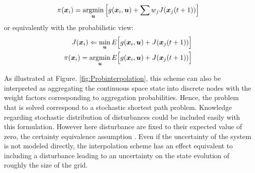 %
\begin{align}
\pi(\boldsymbol{x}_i) = \operatornamewithlimits{argmin}\limits_{\boldsymbol{u}} 
\left[ g(\boldsymbol{x}_i,\boldsymbol{u}) + \sum{ w_j J(\boldsymbol{x}_j(t+1))}  \right]
\end{align}
%
or equivalently with the probabilistic view:
%
\begin{align}
J(\boldsymbol{x}_i) \Leftarrow \operatornamewithlimits{min}\limits_{\boldsymbol{u}} E \Big[ g(\boldsymbol{x}_i,\boldsymbol{u}) + J(\boldsymbol{x}_j(t+1))  \Big] \\
\pi(\boldsymbol{x}_i) = \operatornamewithlimits{argmin}\limits_{\boldsymbol{u}}  E \Big[ g(\boldsymbol{x}_i,\boldsymbol{u}) + J(\boldsymbol{x}_j(t+1))  \Big]
\end{align}



As illustrated at Figure. \ref{fig:Probinterpolation}, this scheme can also be interpreted as aggregating the continuous space state into discrete nodes with the weight factors corresponding to aggregation probabilities. Hence, the problem that is solved correspond to a stochastic shortest path problem. Knowledge regarding stochastic distribution of disturbances could be included easily with this formulation. However here disturbance are fixed to their expected value of zero, the certainty equivalence assumption \cite{bertsekas_dynamic_2000}. Even if the uncertainty of the system is not modeled directly, the interpolation scheme has an effect equivalent to including a disturbance leading to an uncertainty on the state evolution of roughly the size of the grid.


%

